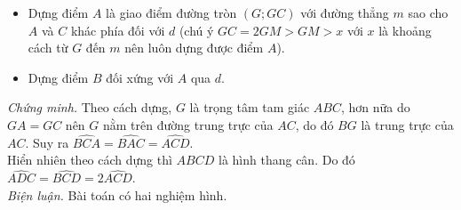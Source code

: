 \begin{bt}
{{
		}
		\begin{itemize}
			\item Dựng điểm $A$ là giao điểm đường tròn $(G;GC)$ với đường thẳng $m$ sao cho $A$ và $C$ khác phía đối với $d$ (chú ý $GC=2GM>GM>x$ với $x$ là khoảng cách từ $G$ đến $m$ nên luôn dựng được điểm $A$).
			\item Dựng điểm $B$ đối xứng với $A$ qua $d$.
		\end{itemize}
		\textit{Chứng minh.} Theo cách dựng, $G$ là trọng tâm tam giác $ABC$, hơn nữa do $GA=GC$ nên $G$ nằm trên đường trung trực của $AC$, do đó $BG$ là trung trực của $AC$. Suy ra $\widehat{BCA}=\widehat{BAC}=\widehat{ACD}$.\\
		Hiển nhiên theo cách dựng thì $ABCD$ là hình thang cân. Do đó $\widehat{ADC}=\widehat{BCD}=2\widehat{ACD}$.\\
		\textit{Biện luận.} Bài toán có hai nghiệm hình.
	}
\end{bt}


